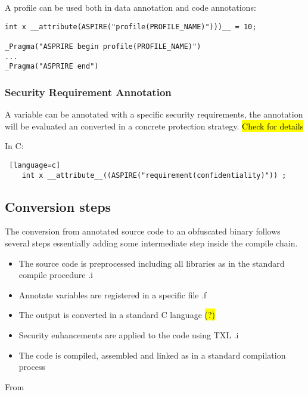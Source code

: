 A profile can be used both in data annotation and code annotations:

\begin{lstlisting}
int x __attribute(ASPIRE("profile(PROFILE_NAME)")))__ = 10;

_Pragma("ASPRIRE begin profile(PROFILE_NAME)")
...
_Pragma("ASPRIRE end")
\end{lstlisting}

\subsubsection{Security Requirement Annotation}
A variable can be annotated with a specific security requirements, the annotation will be evaluated an converted in a concrete protection strategy.
\hl{Check for details}
\begin{itemize}
\end{itemize}
In C:
\begin{lstlisting} [language=c]
	int x __attribute__((ASPIRE("requirement(confidentiality)")) ;
\end{lstlisting}

\subsection{Conversion steps}
The conversion from annotated source code to an obfuscated binary follows several steps essentially adding some intermediate step inside the compile chain.
\begin{itemize}
	\item The source code is preprocessed including all libraries as in the standard compile procedure .i
	\item Annotate variables are registered in a specific file .f
	\item The output is converted in a standard C language \hl{(?)}
	\item Security enhancements are applied to the code using TXL  .i
	\item The code is compiled, assembled and linked as in a standard compilation process
\end{itemize}

From \cite{ceccato2014cryptographyDataObfuscation}